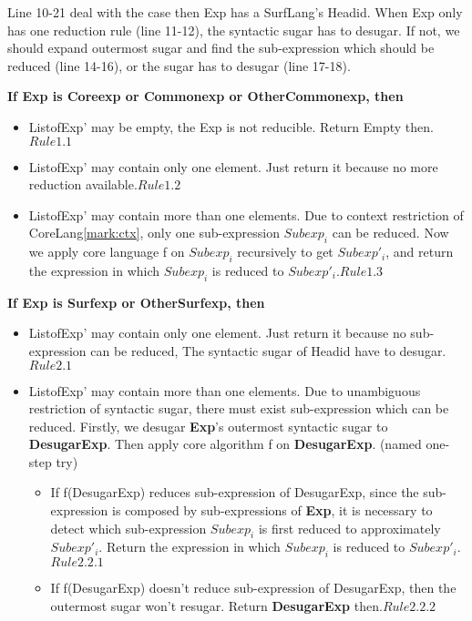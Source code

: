 Line 10-21 deal with the case then Exp has a SurfLang's Headid. When Exp only has one reduction rule (line 11-12), the syntactic sugar has to desugar. If not, we should expand outermost sugar and find the sub-expression which should be reduced (line 14-16), or the sugar has to desugar (line 17-18).

\begin{flushleft}
	\large{\bfseries{
			If Exp is Coreexp or Commonexp or OtherCommonexp, then
		}	
	}	
\end{flushleft}
\begin{itemize}
	\item ListofExp' may be empty, the Exp is not reducible. Return Empty then.\hfill $Rule1.1$
	\item ListofExp' may contain only one element. Just return it because no more reduction available.\hfill $Rule1.2$
	\item ListofExp' may contain more than one elements. Due to context restriction of CoreLang\ref{mark:ctx}, only one sub-expression {\bfseries $Subexp_{i}$} can be reduced. Now we apply core language f on {\bfseries $Subexp_{i}$} recursively to get {\bfseries $Subexp'_{i}$}, and return the expression in which {\bfseries $Subexp_{i}$} is reduced to {\bfseries $Subexp'_{i}$}.\hfill $Rule1.3$
	
\end{itemize}

\begin{flushleft}
	\large{\bfseries{
			If Exp is Surfexp or OtherSurfexp, then
		}
	}
\end{flushleft}
\begin{itemize}
	\item ListofExp' may contain only one element. Just return it because no sub-expression can be reduced, The syntactic sugar of Headid have to desugar.\hfill $Rule2.1$
	\item ListofExp' may contain more than one elements. Due to unambiguous restriction of syntactic sugar, there must exist sub-expression which can be reduced. Firstly, we desugar {\bfseries Exp}'s outermost syntactic sugar to {\bfseries DesugarExp}. Then apply core algorithm f on {\bfseries DesugarExp}. (named one-step try)
	\begin{itemize}
		\item If f(DesugarExp) reduces sub-expression of DesugarExp, since the sub-expression is composed by sub-expressions of {\bfseries Exp}, it is necessary to detect which sub-expression {\bfseries $Subexp_{i}$} is first reduced to approximately {\bfseries $Subexp'_{i}$}. Return the expression in which {\bfseries $Subexp_{i}$} is reduced to {\bfseries $Subexp'_{i}$}.\hfill $Rule2.2.1$
		\item If f(DesugarExp) doesn't reduce sub-expression of DesugarExp, then the outermost sugar won't resugar. Return {\bfseries DesugarExp} then.\hfill $Rule2.2.2$ 
	\end{itemize}
\end{itemize}

